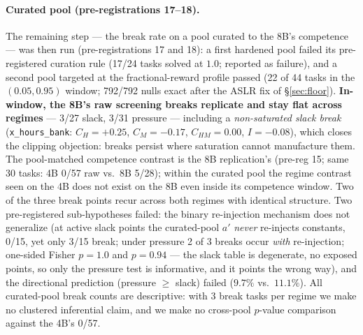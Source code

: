 \documentclass{article}
\theoremstyle{remark}
\begin{document}
\paragraph{Curated pool (pre-registrations 17--18).} The remaining step ---
the break rate on a
pool curated to the 8B's competence --- was then run (pre-registrations 17
and 18): a first hardened pool failed its pre-registered curation rule
(17/24 tasks solved at $1.0$; reported as failure), and a second pool
targeted at the fractional-reward profile passed (22 of 44 tasks in the
$(0.05,0.95)$ window; 792/792 nulls exact after the ASLR fix of
\S\ref{sec:floor}). \textbf{In-window, the 8B's raw screening breaks
replicate and stay flat across regimes} --- 3/27 slack, 3/31 pressure ---
including a \emph{non-saturated slack break}
(\texttt{x\_hours\_bank}: $C_H=+0.25$, $C_M=-0.17$, $C_{HM}=0.00$,
$I=-0.08$), which closes the clipping objection: breaks persist where
saturation cannot manufacture them. The pool-matched competence contrast is
the 8B replication's (pre-reg 15; same 30 tasks: 4B 0/57 raw vs.\ 8B 5/28); within the curated pool the
regime contrast seen on the
4B does not exist on the 8B even inside its competence window. Two of the
three break points recur across both regimes with identical structure.
Two pre-registered sub-hypotheses failed: the
binary re-injection mechanism does not generalize (at active slack points
the curated-pool $a'$ \emph{never} re-injects constants, 0/15, yet only
3/15 break; under pressure 2 of 3 breaks occur \emph{with} re-injection;
one-sided Fisher $p=1.0$ and $p=0.94$ --- the slack table is degenerate, no
exposed points, so only the pressure test is informative, and it points the
wrong way), and the directional prediction
(pressure $\geq$ slack) failed ($9.7\%$ vs.\ $11.1\%$). All curated-pool
break counts are descriptive: with 3 break tasks per regime we make no
clustered inferential claim, and we make no cross-pool $p$-value comparison
against the 4B's 0/57.
\end{document}
